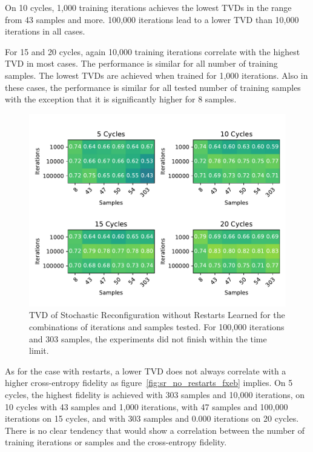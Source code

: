 On 10 cycles, 1,000 training iterations achieves the lowest TVDs in the range from 43 samples and more. 
100,000 iterations lead to a lower TVD than 10,000 iterations in all cases. 

For 15 and 20 cycles, again 10,000 training iterations correlate with the highest TVD in most cases.
The performance is similar for all number of training samples. The lowest TVDs are achieved when trained for 1,000
iterations. Also in these cases, the performance is similar for all tested number of training samples with 
the exception that it is significantly higher for 8 samples.

\begin{figure}[H]
  \centering
  \includegraphics[width=\textwidth]{figures/results/SR-no-restarts-learned/tvd_heatmap.pdf}
  \caption[TVD of Stochastic Reconfiguration without Restarts Learned]{TVD of Stochastic 
  Reconfiguration without Restarts Learned for the combinations of iterations and samples tested.
  For 100,000 iterations and 303 samples, the experiments did not finish within the time limit.}
  \label{fig:sr_no_restarts_tvd}
\end{figure}

As for the case with restarts, a lower TVD does not always correlate with a higher cross-entropy fidelity as 
figure~\ref{fig:sr_no_restarts_fxeb}
implies. On 5 cycles, the highest fidelity is achieved with 303 samples and 10,000 iterations, on 10 cycles 
with 43 samples and 1,000 iterations, with 47 samples and 100,000 iterations on 15 cycles, and with 303 samples and 
0.000 iterations on 20 cycles. There is no clear tendency that would show a correlation between 
the number of training iterations or samples and the cross-entropy fidelity.

